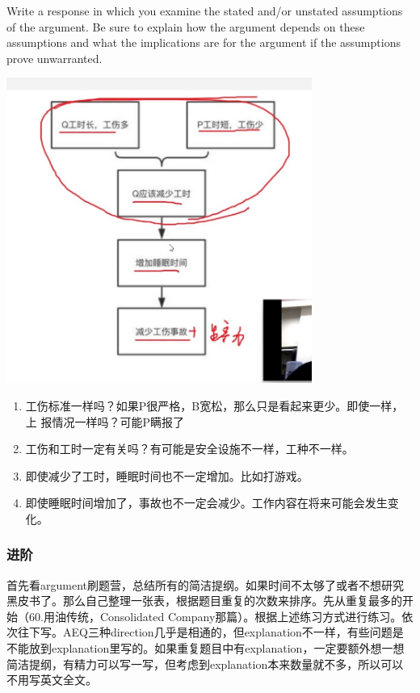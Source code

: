 \documentclass[11pt,a4paper]{article}
\begin{document}
{{{			\textrm{
				Write a response in which you examine the stated and/or unstated assumptions of the argument. Be sure to explain how the argument depends on these assumptions and what the implications are for the argument if the assumptions prove unwarranted.}
			\begin{center}
				\includegraphics[width=10cm]{GGRE.jpg}
			\end{center}
		
			\begin{enumerate}
				\item 工伤标准一样吗？如果P很严格，B宽松，那么只是看起来更少。即使一样，上	报情况一样吗？可能P瞒报了
				\item 工伤和工时一定有关吗？有可能是安全设施不一样，工种不一样。
				\item 即使减少了工时，睡眠时间也不一定增加。比如打游戏。
				\item 即使睡眠时间增加了，事故也不一定会减少。工作内容在将来可能会发生变化。				
			\end{enumerate}
			
			\subsubsection*{进阶}
				首先看argument刷题营，总结所有的简洁提纲。如果时间不太够了或者不想研究黑皮书了。那么自己整理一张表，根据题目重复的次数来排序。先从重复最多的开始（60.用油传统，Consolidated Company那篇）。根据上述练习方式进行练习。依次往下写。AEQ三种direction几乎是相通的，但explanation不一样，有些问题是不能放到explanation里写的。如果重复题目中有explanation，一定要额外想一想简洁提纲，有精力可以写一写，但考虑到explanation本来数量就不多，所以可以不用写英文全文。
			
}}}
\end{document}
